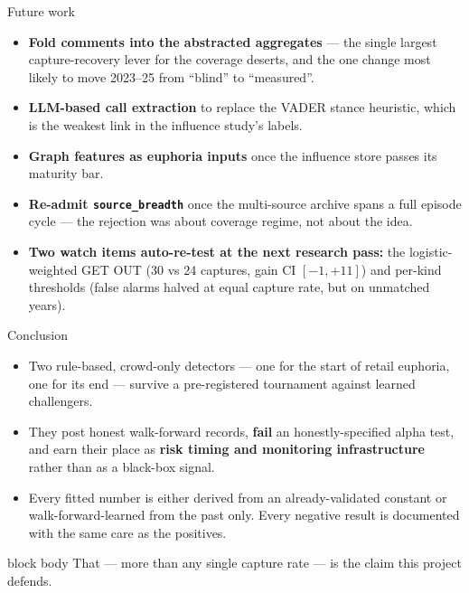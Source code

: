 \documentclass[aspectratio=169,11pt]{beamer}
\begin{document}
\begin{frame}{Future work}
  \begin{itemize}\small
    \item \textbf{Fold comments into the abstracted aggregates} --- the single
      largest capture-recovery lever for the coverage deserts, and the one
      change most likely to move 2023--25 from ``blind'' to ``measured''.
    \item \textbf{LLM-based call extraction} to replace the VADER stance
      heuristic, which is the weakest link in the influence study's labels.
    \item \textbf{Graph features as euphoria inputs} once the influence store
      passes its maturity bar.
    \item \textbf{Re-admit \texttt{source\_breadth}} once the multi-source
      archive spans a full episode cycle --- the rejection was about coverage
      regime, not about the idea.
    \item \textbf{Two watch items auto-re-test at the next research pass:}
      the logistic-weighted GET OUT (30 vs 24 captures, gain CI $[-1,+11]$)
      and per-kind thresholds (false alarms halved at equal capture rate, but
      on unmatched years).
  \end{itemize}
\end{frame}

\begin{frame}{Conclusion}
  \vspace{0.3em}
  \begin{itemize}
    \item Two rule-based, crowd-only detectors --- one for the start of retail
      euphoria, one for its end --- survive a pre-registered tournament
      against learned challengers.
    \item They post honest walk-forward records, \textbf{fail} an
      honestly-specified alpha test, and earn their place as \textbf{risk
      timing and monitoring infrastructure} rather than as a black-box signal.
    \item Every fitted number is either derived from an already-validated
      constant or walk-forward-learned from the past only. Every negative
      result is documented with the same care as the positives.
  \end{itemize}
  \vspace{0.8em}
  \begin{beamercolorbox}[wd=\linewidth,sep=0.9em]{block body}
    That --- more than any single capture rate --- is the claim this project
    defends.
  \end{beamercolorbox}
\end{frame}
\end{document}
